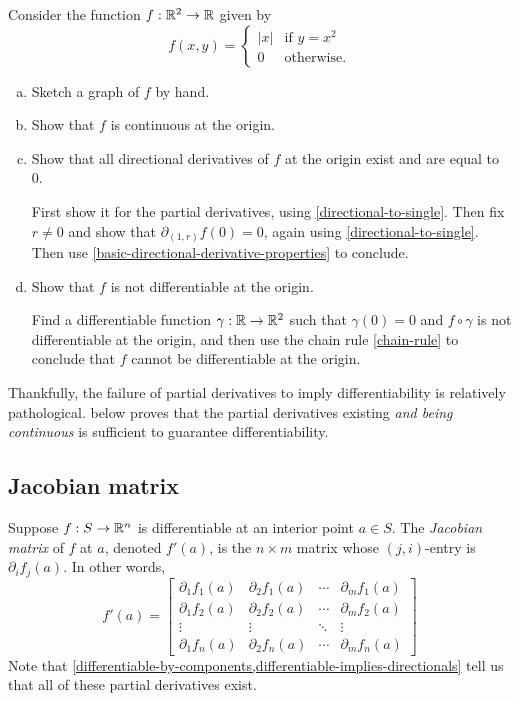 \begin{exercise} \label{directionals-and-linear-dont-imply-differentiable}
	Consider the function $f : \mathbb{R}^2 \to \mathbb{R}$ given by
	\[ f(x,y) = \begin{cases} |x| & \text{if } y = x^2 \\ 0 & \text{otherwise}. \end{cases} \]
	\begin{enumerate}[(a)]
		\item Sketch a graph of $f$ by hand.
		\item Show that $f$ is continuous at the origin. 
		\item Show that all directional derivatives of $f$ at the origin exist and are equal to 0. 
		\begin{hint}
			First show it for the partial derivatives, using \cref{directional-to-single}. Then fix $r \neq 0$ and show that $\partial_{(1,r)}f(0) = 0$, again using \cref{directional-to-single}. Then use \cref{basic-directional-derivative-properties} to conclude. 
		\end{hint}
		\item Show that $f$ is not differentiable at the origin.
		\begin{hint}
			Find a differentiable function $\gamma : \mathbb{R} \to \mathbb{R}^2$ such that $\gamma(0) = 0$ and $f \circ \gamma$ is not differentiable at the origin, and then use the chain rule \ref{chain-rule} to conclude that $f$ cannot be differentiable at the origin. 
		\end{hint}
	\end{enumerate} 
\end{exercise}

Thankfully, the failure of partial derivatives to imply differentiability is relatively pathological.  below proves that the partial derivatives existing \emph{and being continuous} is sufficient to guarantee differentiability. 

\subsection{Jacobian matrix}

\begin{definition}  
	Suppose $f : S \to \mathbb{R}^n$ is differentiable at an interior point $a \in S$. The \emph{Jacobian matrix} of $f$ at $a$, denoted $f'(a)$, is the $n \times m$ matrix whose $(j, i)$-entry is $\partial_i f_j(a)$. In other words,
	\[ f'(a) = \begin{bmatrix} \partial_1 f_1(a) & \partial_2 f_1(a) & \dotsb & \partial_m f_1(a) \\ 
	\partial_1 f_2(a) & \partial_2 f_2(a) & \dotsb & \partial_m f_2(a) \\
	\vdots & \vdots & \ddots & \vdots \\ 
	\partial_1 f_n(a) & \partial_2 f_n(a) & \dotsb & \partial_m f_n(a) \end{bmatrix} \]
	Note that \cref{differentiable-by-components,differentiable-implies-directionals} tell us that all of these partial derivatives exist. 
\end{definition}

